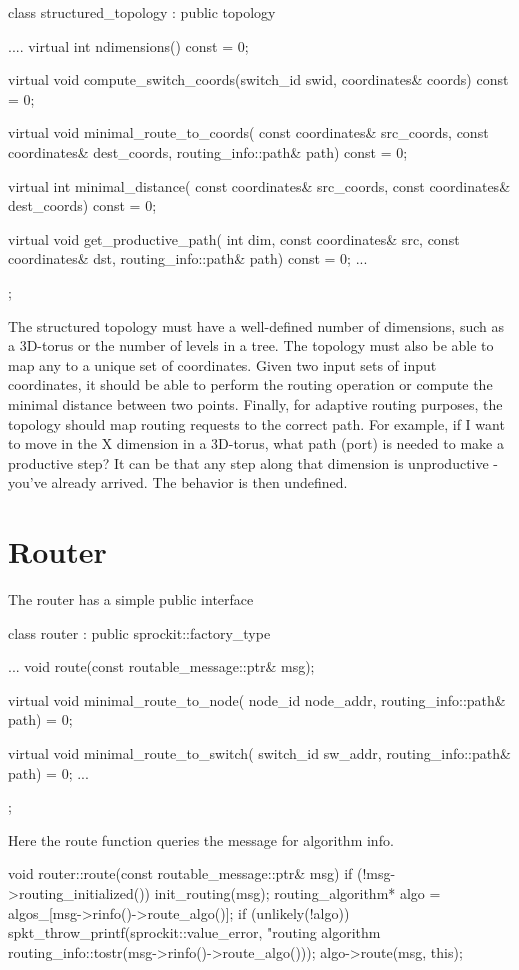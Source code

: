 \begin{CppCode}
class structured_topology :
  public topology
{
  ....
  virtual int
  ndimensions() const = 0;	

  virtual void
  compute_switch_coords(switch_id swid, coordinates& coords) const = 0;

  virtual void
  minimal_route_to_coords(
    const coordinates& src_coords,
    const coordinates& dest_coords,
    routing_info::path& path) const = 0;

  virtual int
  minimal_distance(
    const coordinates& src_coords,
    const coordinates& dest_coords) const = 0;

  virtual void
  get_productive_path(
    int dim,
    const coordinates& src,
    const coordinates& dst,
    routing_info::path& path) const = 0;
  ...
};
\end{CppCode}
The structured topology must have a well-defined number of dimensions, such as a 3D-torus or the number of levels in a tree.
The topology must also be able to map any \switchid to a unique set of coordinates.
Given two input sets of input coordinates, it should be able to perform the routing operation or compute the minimal distance between two points.
Finally, for adaptive routing purposes, the topology should map routing requests to the correct path.
For example, if I want to move in the X dimension in a 3D-torus, what path (port) is needed to make a productive step?
It can be that any step along that dimension is unproductive - you've already arrived.
The behavior is then undefined.

\section{Router}
The router has a simple public interface

\begin{CppCode}
class router :
  public sprockit::factory_type
{
...
  void
  route(const routable_message::ptr& msg);

  virtual void
  minimal_route_to_node(
    node_id node_addr,
    routing_info::path& path) = 0;
    
  virtual void
  minimal_route_to_switch(
    switch_id sw_addr,
    routing_info::path& path) = 0;
...
};
\end{CppCode}

Here the route function queries the message for algorithm info.

\begin{CppCode}
void
router::route(const routable_message::ptr& msg)
{
  if (!msg->routing_initialized()) {
    init_routing(msg);
  }
  routing_algorithm* algo = algos_[msg->rinfo()->route_algo()];
  if (unlikely(!algo)) {
    spkt_throw_printf(sprockit::value_error,
                     "routing algorithm %
                     routing_info::tostr(msg->rinfo()->route_algo()));
  }
  algo->route(msg, this);
}
\end{CppCode}


